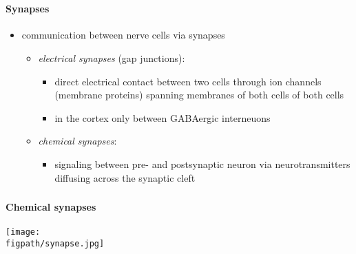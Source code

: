 \documentclass[8pt,t,usepdftitle=false]{beamer}
\def\figpath{\src/figures}
\begin{document}
\section{\ttl}
\begin{frame}[plain]
  \frametitle{\ttl}
  \framesubtitle{Synapses}
  \begin{itemize}
  \item communication between nerve cells via synapses
    \begin{itemize}
    \item<1-> \emph{electrical synapses} (gap junctions): 
      \begin{itemize}
      \item direct electrical contact between two cells through ion channels 
        (membrane proteins) spanning membranes of both cells
        of both cells
      \item in the cortex only between GABAergic interneuons
      \end{itemize}
    \item<2-> \emph{chemical synapses}:
      \begin{itemize}
      \item signaling between pre- and postsynaptic neuron via neurotransmitters 
        diffusing across the synaptic cleft
      \end{itemize}
    \end{itemize}
  \end{itemize}
  \parbox{\linewidth}{
  }  
\end{frame}
\begin{frame}[plain]
  \frametitle{\ttl}
  \framesubtitle{Chemical synapses}  
  \begin{center}
    \vspace*{-0.3cm}
  \parbox{0.62\linewidth}{
    \texttt{[image: \\figpath/synapse.jpg]}\\ %
  }    
  \end{center}
\end{frame}
\end{document}
